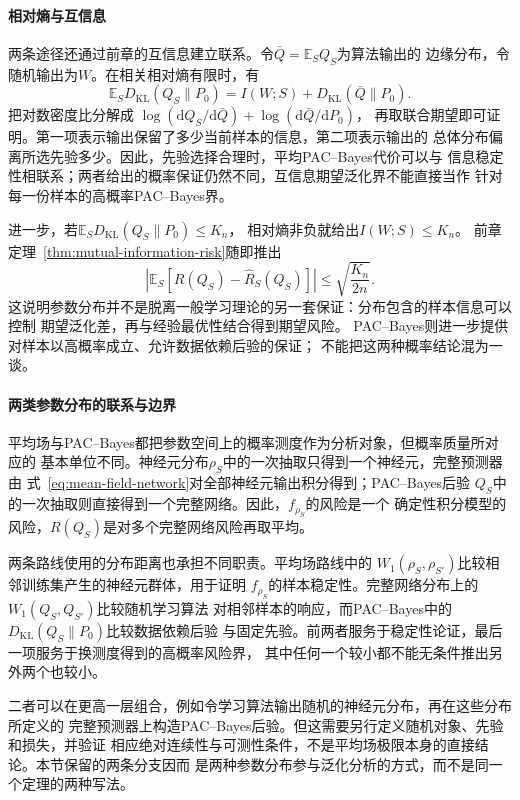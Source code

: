 \paragraph{相对熵与互信息}

两条途径还通过前章的互信息建立联系。令$\bar Q=\mathbb E_S Q_S$为算法输出的
边缘分布，令随机输出为$W$。在相关相对熵有限时，有
\begin{equation}
 \mathbb E_SD_{\mathrm{KL}}(Q_S\|P_0)
 =I(W;S)+D_{\mathrm{KL}}(\bar Q\|P_0).
 \label{eq:pac-bayes-information-decomposition}
\end{equation}
把对数密度比分解成
$\log(\mathrm dQ_S/\mathrm d\bar Q)+\log(\mathrm d\bar Q/\mathrm dP_0)$，
再取联合期望即可证明。第一项表示输出保留了多少当前样本的信息，第二项表示输出的
总体分布偏离所选先验多少。因此，先验选择合理时，平均PAC--Bayes代价可以与
信息稳定性相联系；两者给出的概率保证仍然不同，互信息期望泛化界不能直接当作
针对每一份样本的高概率PAC--Bayes界。

进一步，若$\mathbb E_SD_{\mathrm{KL}}(Q_S\|P_0)\leq K_n$，
相对熵非负就给出$I(W;S)\leq K_n$。
前章定理~\ref{thm:mutual-information-risk}随即推出
\[
 \left|\mathbb E_S[R(Q_S)-\hat R_S(Q_S)]\right|
 \leq\sqrt{\frac{K_n}{2n}}.
\]
这说明参数分布并不是脱离一般学习理论的另一套保证：分布包含的样本信息可以控制
期望泛化差，再与经验最优性结合得到期望风险。
PAC--Bayes则进一步提供对样本以高概率成立、允许数据依赖后验的保证；
不能把这两种概率结论混为一谈。

\paragraph{两类参数分布的联系与边界}

平均场与PAC--Bayes都把参数空间上的概率测度作为分析对象，但概率质量所对应的
基本单位不同。神经元分布$\rho_S$中的一次抽取只得到一个神经元，完整预测器由
式~\eqref{eq:mean-field-network}对全部神经元输出积分得到；PAC--Bayes后验
$Q_S$中的一次抽取则直接得到一个完整网络。因此，$f_{\rho_S}$的风险是一个
确定性积分模型的风险，$R(Q_S)$是对多个完整网络风险再取平均。

两条路线使用的分布距离也承担不同职责。平均场路线中的
$W_1(\rho_S,\rho_{S'})$比较相邻训练集产生的神经元群体，用于证明
$f_{\rho_S}$的样本稳定性。完整网络分布上的$W_1(Q_S,Q_{S'})$比较随机学习算法
对相邻样本的响应，而PAC--Bayes中的$D_{\mathrm{KL}}(Q_S\|P_0)$比较数据依赖后验
与固定先验。前两者服务于稳定性论证，最后一项服务于换测度得到的高概率风险界，
其中任何一个较小都不能无条件推出另外两个也较小。

二者可以在更高一层组合，例如令学习算法输出随机的神经元分布，再在这些分布所定义的
完整预测器上构造PAC--Bayes后验。但这需要另行定义随机对象、先验和损失，并验证
相应绝对连续性与可测性条件，不是平均场极限本身的直接结论。本节保留的两条分支因而
是两种参数分布参与泛化分析的方式，而不是同一个定理的两种写法。

